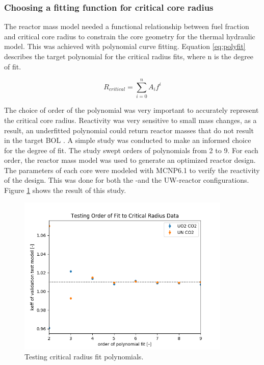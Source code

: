 \subsubsection{Choosing a fitting function for critical core radius}
The reactor mass model needed a functional relationship between fuel fraction
and critical core radius to constrain the core geometry for the thermal
hydraulic model. This was achieved with polynomial curve fitting.
Equation \ref{eq:polyfit} describes the target polynomial for the critical
radius fits, where n is the degree of fit.

\begin{equation}
    R_{critical} = \sum_{i=0}^n A_if^i
    \label{eq:polyfit}
\end{equation}

The choice of order of the polynomial was very important to accurately represent the
critical core radius. Reactivity was very sensitive to small mass changes, as
a result, an underfitted polynomial could return reactor masses that do not
result in the target BOL \keff. A simple study was conducted to make an informed
choice for the degree of fit. The study swept orders of polynomials from 2 to 9.
For each order, the reactor mass model was used to generate an optimized reactor
design. The parameters of each core were modeled with MCNP6.1 to verify the
reactivity of the design. This was done for both the \uox-\codiox and
the UW-\codiox reactor configurations. Figure \ref{fig:fit_order_test} shows the
result of this study.

\begin{figure}[h]
    \centering
    \includegraphics[width=4in]{../images/poly_order_test.png}
\caption{Testing critical radius fit polynomials.}
\label{fig:fit_order_test}
\end{figure}

